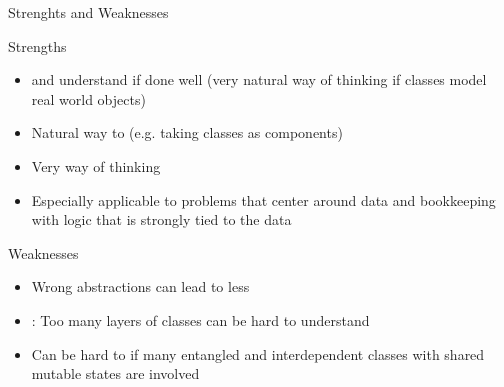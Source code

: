 \begin{frame}{Strenghts and Weaknesses}
		
\begin{block}{Strengths}
	
	\begin{itemize}
		\item {} and understand if done well (very natural way of thinking if classes model real world objects)
		\item Natural way to  (e.g. taking classes as components)
		\item Very  way of thinking
		\item Especially applicable to problems that center around data and bookkeeping with logic that is strongly tied to the data
	\end{itemize}
\end{block}
\begin{block}{Weaknesses}
\begin{itemize}
	\item Wrong abstractions can lead to less 
	\item {}: Too many layers of classes can be hard to understand
	\item Can be hard to  if many entangled and interdependent classes with shared mutable states are involved 
\end{itemize}
\end{block}
\end{frame}